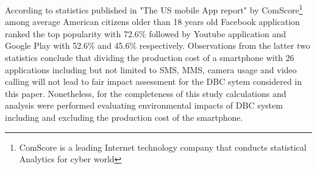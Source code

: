 \documentclass[conference]{IEEEtran}
\begin{document}
According to statistics published in "The US mobile App report" by ComScore\footnote{ComScore is a leading Internet technology company that conducts statistical Analytics for cyber world} among average American citizens older than 18 years old  Facebook application ranked the top popularity with 72.6\% followed by Youtube application and Google Play with 52.6\% and 45.6\% respectively. Observations from the latter two statistics conclude that dividing the production cost of a smartphone with 26 applications including but not limited to SMS, MMS, camera usage and video calling will not lead to fair impact assessment for the DBC sytem considered in this paper. Nonetheless, for the completeness of this study calculations and analysis were performed evaluating environmental impacts of DBC system including and excluding the production cost of the smartphone.




\ifCLASSOPTIONcaptionsoff
  \newpage
\fi






%
%
%












\end{document}
